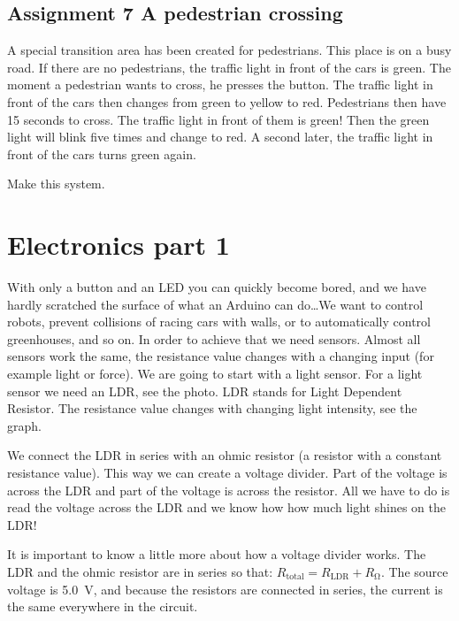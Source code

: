 \documentclass{arduino}
\begin{document}
\subsection{Assignment 7 A pedestrian crossing}

A special transition area has been created for pedestrians. This place is on a busy road. If there are no pedestrians, the traffic light in front of the cars is green. The moment a pedestrian wants to cross, he presses the button. The traffic light in front of the cars then changes from green to yellow to red. Pedestrians then have 15 seconds to cross. The traffic light in front of them is green! Then the green light will blink five times and change to red. A second later, the traffic light in front of the cars turns green again.

Make this system.

\newpage

\section{Electronics part 1}



With only a button and an LED you can quickly become bored, and we have hardly scratched the surface of what an Arduino can do\dots We want to control robots, prevent collisions of racing cars with walls, or to automatically control greenhouses, and so on. In order to achieve that we need sensors. Almost all sensors work the same, the resistance value changes with a changing input (for example light or force). We are going to start with a light sensor. For a light sensor we need an LDR, see the photo. LDR stands for Light Dependent Resistor. The resistance value changes with changing light intensity, see the graph.


We connect the LDR in series with an ohmic resistor (a resistor with a constant resistance value). This way we can create a voltage divider. Part of the voltage is across the LDR and part of the voltage is across the resistor. All we have to do is read the voltage across the LDR and we know how how much light shines on the LDR!

It is important to know a little more about how a voltage divider works. The LDR and the ohmic resistor are in series so that: $ R_\mathrm{total} = R_\mathrm{LDR} + R_{\si{\ohm}} $. The source voltage is \SI{5.0}{\volt}, and because the resistors are connected in series, the current is the same everywhere in the circuit.
\end{document}
